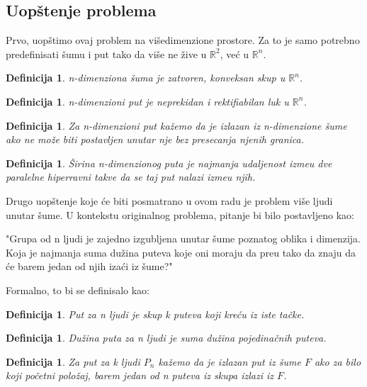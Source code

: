 \documentclass[11pt,letter]{article}
\newtheorem{df}[teo]{\bf Definicija}
\begin{document}
\subsection[Uop\v stenje problema]{Uop\v stenje problema}
\bigskip
Prvo, uop\v stimo ovaj problem na vi\v sedimenzione prostore. Za to je samo potrebno predefinisati \v sumu i put tako da vi\v se ne \v zive u $\mathbb{R}^2$, ve\' c u $\mathbb{R}^n$.
\smallskip
\begin{df} n-dimenziona \v suma je zatvoren, konveksan skup u $\mathbb{R}^n$.\end{df}
\begin{df} n-dimenzioni put je neprekidan i rektifiabilan luk u $\mathbb{R}^n$.\end{df}
\begin{df} Za n-dimenzioni put ka\v zemo da je izlazan iz n-dimenzione \v sume ako ne mo\v ze biti postavljen unutar nje bez presecanja njenih granica.\end{df}
\begin{df} \v Sirina n-dimenzionog puta je najmanja udaljenost izme\dj u dve paralelne hiperravni takve da se taj put nalazi izme\dj u njih. \end{df}
\smallskip

\indent Drugo uop\v stenje koje \' ce biti posmatrano u ovom radu je problem vi\v se ljudi unutar \v sume. U kontekstu originalnog problema, pitanje bi bilo postavljeno kao:
\begin{center}
"Grupa od n ljudi je zajedno izgubljena unutar \v sume poznatog oblika i dimenzija. Koja je najmanja suma du\v zina puteva koje oni moraju da pre\dj u tako da znaju da \' ce barem jedan od njih iza\' ci iz \v sume?"
\end{center}
\newpage
Formalno, to bi se definisalo kao:
\begin{df} Put za n ljudi je skup k puteva koji kre\' cu iz iste ta\v cke. \end{df}
\begin{df} Du\v zina puta za n ljudi je suma du\v zina pojedina\v cnih puteva.\end{df}
\begin{df} Za put za k ljudi $P_n$ ka\v zemo da je izlazan put iz \v sume $F$ ako za bilo koji po\v cetni polo\v zaj, barem jedan od n puteva iz skupa izlazi iz $F$.\end{df}
\smallskip
\end{document}
